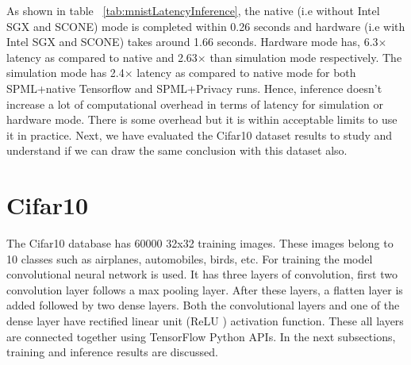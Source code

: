 As shown in table ~\ref{tab:mnistLatencyInference}, the native (i.e without Intel SGX and SCONE) mode is completed within 0.26 seconds and hardware (i.e with Intel SGX and SCONE) takes around 1.66 seconds. Hardware mode has, 6.3$\times$ latency as compared to native and 2.63$\times$ than simulation mode respectively. The simulation mode has 2.4$\times$ latency as compared to native mode for both SPML+native Tensorflow and SPML+Privacy runs. Hence, inference doesn't increase a lot of computational overhead in terms of latency for simulation or hardware mode. There is some overhead but it is within acceptable limits to use it in practice. Next, we have evaluated the Cifar10 dataset results to study and understand if we can draw the same conclusion with this dataset also.

\section{Cifar10}
\label{sec:evalCifar10}
The Cifar10 database\cite{13} has 60000 32x32 training images. These images belong to 10 classes such as airplanes, automobiles, birds, etc. For training the model convolutional neural network is used. It has three layers of convolution, first two convolution layer follows a max pooling layer. After these layers, a flatten layer is added followed by two dense layers. Both the convolutional layers and one of the dense layer have rectified linear unit (ReLU ) activation function. These all layers are connected together using TensorFlow Python APIs. In the next subsections, training and inference results are discussed.
